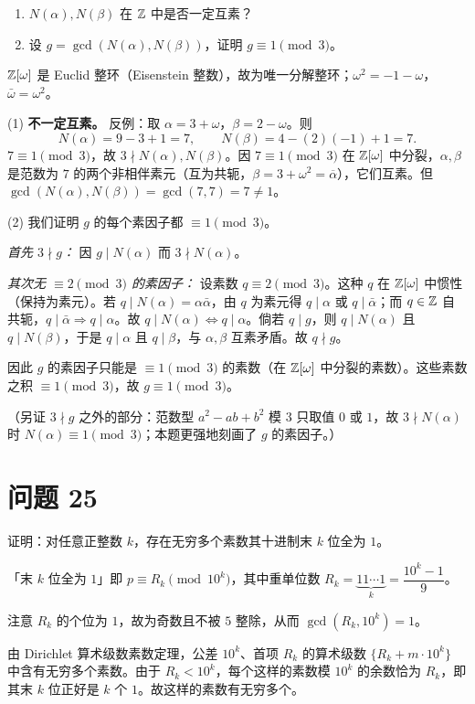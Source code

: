 \documentclass{article}
\begin{document}
\begin{enumerate}[(1)]
  \item $N(\alpha),N(\beta)$ 在 $\mathbb{Z}$ 中是否一定互素？
  \item 设 $g=\gcd(N(\alpha),N(\beta))$，证明 $g\equiv1\pmod3$。
\end{enumerate}

\begin{solution}
  $\mathbb{Z}[\omega]$ 是 Euclid 整环（Eisenstein 整数），故为唯一分解整环；$\omega^2=-1-\omega$，$\bar\omega=\omega^2$。

  (1) \textbf{不一定互素。} 反例：取 $\alpha=3+\omega$，$\beta=2-\omega$。则
  \[
    N(\alpha)=9-3+1=7,\qquad N(\beta)=4-(2)(-1)+1=7 .
  \]
  $7\equiv1\pmod3$，故 $3\nmid N(\alpha),N(\beta)$。因 $7\equiv1\pmod3$ 在 $\mathbb{Z}[\omega]$ 中分裂，$\alpha,\beta$ 是范数为 $7$ 的两个非相伴素元（互为共轭，$\beta=3+\omega^2=\overline{\alpha}$），它们互素。但 $\gcd(N(\alpha),N(\beta))=\gcd(7,7)=7\ne1$。

  (2) 我们证明 $g$ 的每个素因子都 $\equiv1\pmod3$。

  \emph{首先 $3\nmid g$：} 因 $g\mid N(\alpha)$ 而 $3\nmid N(\alpha)$。

  \emph{其次无 $\equiv2\pmod3$ 的素因子：} 设素数 $q\equiv2\pmod3$。这种 $q$ 在 $\mathbb{Z}[\omega]$ 中惯性（保持为素元）。若 $q\mid N(\alpha)=\alpha\bar\alpha$，由 $q$ 为素元得 $q\mid\alpha$ 或 $q\mid\bar\alpha$；而 $q\in\mathbb{Z}$ 自共轭，$q\mid\bar\alpha\Rightarrow q\mid\alpha$。故 $q\mid N(\alpha)\iff q\mid\alpha$。倘若 $q\mid g$，则 $q\mid N(\alpha)$ 且 $q\mid N(\beta)$，于是 $q\mid\alpha$ 且 $q\mid\beta$，与 $\alpha,\beta$ 互素矛盾。故 $q\nmid g$。

  因此 $g$ 的素因子只能是 $\equiv1\pmod3$ 的素数（在 $\mathbb{Z}[\omega]$ 中分裂的素数）。这些素数之积 $\equiv1\pmod3$，故 $g\equiv1\pmod3$。

  （另证 $3\nmid g$ 之外的部分：范数型 $a^2-ab+b^2$ 模 $3$ 只取值 $0$ 或 $1$，故 $3\nmid N(\alpha)$ 时 $N(\alpha)\equiv1\pmod3$；本题更强地刻画了 $g$ 的素因子。）
\end{solution}

\section{问题 25}

证明：对任意正整数 $k$，存在无穷多个素数其十进制末 $k$ 位全为 $1$。

\begin{solution}
  「末 $k$ 位全为 $1$」即 $p\equiv R_k\pmod{10^k}$，其中重单位数 $R_k=\underbrace{11\cdots1}_{k}=\dfrac{10^k-1}{9}$。

  注意 $R_k$ 的个位为 $1$，故为奇数且不被 $5$ 整除，从而 $\gcd(R_k,10^k)=1$。

  由 Dirichlet 算术级数素数定理，公差 $10^k$、首项 $R_k$ 的算术级数 $\{R_k+m\cdot10^k\}$ 中含有无穷多个素数。由于 $R_k<10^k$，每个这样的素数模 $10^k$ 的余数恰为 $R_k$，即其末 $k$ 位正好是 $k$ 个 $1$。故这样的素数有无穷多个。
\end{solution}
\end{document}
